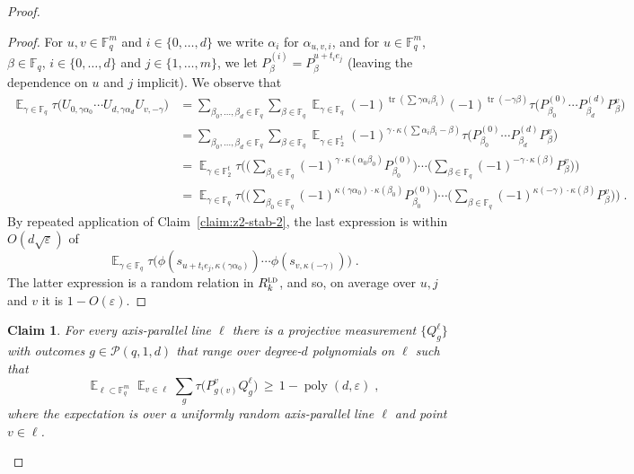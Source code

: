 \documentclass[11pt]{article}
\newtheorem{claim}[theorem]{Claim}
\theoremstyle{definition}
\DeclareMathOperator*{\Expectation}{\mathbb{E}}
\newcommand{\Es}[1]{\Expectation_{#1}}
\newcommand{\F}{\ensuremath{\mathbb{F}}}
\newcommand{\ld}{\textsc{ld}}
\DeclareMathOperator{\poly}{poly}
\newcommand{\eps}{\varepsilon}
\DeclareMathOperator{\tr}{tr}
\renewcommand{\cal}[1]{\mathcal{#1}}
\begin{document}
\begin{proof}
\begin{proof}
For $u,v\in \F_q^m$ and $i\in\{0,\ldots,d\}$ we write $\alpha_i$ for $\alpha_{u,v,i}$, and for $u\in\F_q^m$, $\beta\in\F_q$, $i\in\{0,\ldots,d\}$ and $j\in\{1,\ldots,m\}$, we let $P^{(i)}_\beta = P^{u+t_ie_j}_\beta$ (leaving the dependence on $u$ and $j$ implicit).
We observe that 
\begin{align*}
\Es{\gamma\in\F_q} \tau\big( U_{0,\gamma\alpha_{0}}\cdots U_{d,\gamma\alpha_{d}} U_{v,-\gamma} \big)
&=  \sum_{\beta_0,\ldots,\beta_d\in\F_q}\sum_{\beta\in\F_q} \Es{\gamma\in\F_q} (-1)^{\tr(\sum \gamma \alpha_i\beta_i)} (-1)^{\tr(-\gamma\beta)} \tau\big( P^{(0)}_{\beta_0} \cdots P^{(d)}_{\beta_d} P^v_\beta \big)\\
&= \sum_{\beta_0,\ldots,\beta_d\in\F_q}\sum_{\beta\in\F_q}\Es{\gamma\in\F_2^t} (-1)^{\gamma\cdot \kappa(\sum \alpha_i\beta_i-\beta)} \tau\big( P^{(0)}_{\beta_0} \cdots P^{(d)}_{\beta_d} P^v_\beta \big)\\
&=\Es{\gamma\in\F_2^t}  \tau\Big( \Big(\sum_{\beta_0\in \F_q} (-1)^{\gamma\cdot \kappa(\alpha_0\beta_0)} P^{(0)}_{\beta_0} \Big)\cdots\Big(\sum_{\beta\in \F_q} (-1)^{-\gamma\cdot \kappa(\beta)} P^{v}_{\beta} \Big)\Big)\\
&=\Es{\gamma\in\F_q}  \tau\Big( \Big(\sum_{\beta_0\in \F_q} (-1)^{\kappa( \gamma \alpha_0)\cdot\kappa(\beta_0)} P^{(0)}_{\beta_0} \Big)\cdots\Big(\sum_{\beta\in \F_q} (-1)^{\kappa(-\gamma)\cdot \kappa(\beta)} P^{v}_{\beta} \Big)\Big)\;.
\end{align*}
By repeated application of Claim~\ref{claim:z2-stab-2}, the last expression is within $O(d\sqrt{\eps})$ of 
\[ \Es{\gamma\in\F_q}  \tau\big( \phi(s_{u+t_ie_j,\kappa(\gamma \alpha_0)})\cdots \phi(s_{v,\kappa(-\gamma)}) \big)\;.\]
The latter expression is a random relation in $R^\ld_k$, and so, on average over $u,j$ and $v$ it is $1-O(\eps)$.
\end{proof}


\begin{claim}\label{claim:z2-stab-4}
For every axis-parallel line $\ell$ there is a projective measurement $\{Q^\ell_g\}$ with outcomes $g \in \cal{P}(q,1,d)$ that range over degree-$d$ polynomials on $\ell$ such that
\[ \Es{\ell\subset \F_q^m} \Es{v\in \ell} \sum_g \tau\big( P^v_{g(v)} Q^\ell_g\big) \,\geq\, 1-\poly(d,\eps)\;, \]
where the expectation is over a uniformly random axis-parallel line $\ell$ and point $v\in \ell$. 
\end{claim}


\end{proof}
\end{document}
